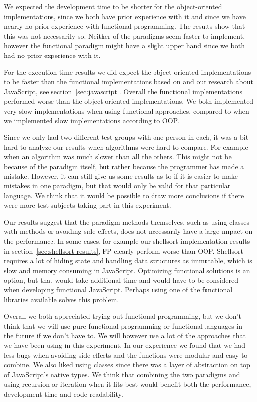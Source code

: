 \documentclass {article}
\begin{document}
We expected the development time to be shorter for the object-oriented implementations, since we both have prior experience with it and since we have nearly no prior experience with functional programming. The results show that this was not necessarily so. Neither of the paradigms seem faster to implement, however the functional paradigm might have a slight upper hand since we both had no prior experience with it. 

For the execution time results we did expect the object-oriented implementations to be faster than the functional implementations based on \cite{hasmadole} and our research about JavaScript, see section~\ref{sec:javascript}. Overall the functional implementations performed worse than the object-oriented implementations. We both implemented very slow implementations when using functional approaches, compared to when we implemented slow implementations according to OOP.

Since we only had two different test groups with one person in each, it was a bit hard to analyze our results when algorithms were hard to compare. For example when an algorithm was much slower than all the others. This might not be because of the paradigm itself, but rather because the programmer has made a mistake. However, it can still give us some results as to if it is easier to make mistakes in one paradigm, but that would only be valid for that particular language. We think that it would be possible to draw more conclusions if there were more test subjects taking part in this experiment.

Our results suggest that the paradigm methods themselves, such as using classes with methods or avoiding side effects, does not necessarily have a large impact on the performance. In some cases, for example our shellsort implementation results in section~\ref{sec:shellsort-results}, FP clearly perform worse than OOP. Shellsort requires a lot of hiding state and handling data structures as immutable, which is slow and memory consuming in JavaScript. Optimizing functional solutions is an option, but that would take additional time and would have to be considered when developing functional JavaScript. Perhaps using one of the functional libraries available solves this problem.

Overall we both appreciated trying out functional programming, but we don't think that we will use pure functional programming or functional languages in the future if we don't have to. We will however use a lot of the approaches that we have been using in this experiment. In our experience we found that we had less bugs when avoiding side effects and the functions were modular and easy to combine. We also liked using classes since there was a layer of abstraction on top of JavaScript's native types. We think that combining the two paradigms and using recursion or iteration when it fits best would benefit both the performance, development time and code readability. 
\end{document}
